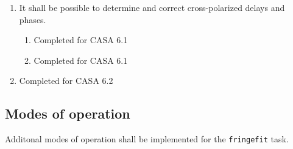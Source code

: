 \documentclass[11pt,a4paper]{article}
\begin{document}
\begin{enumerate}[subseclist]

\item It shall be possible to determine and correct cross-polarized
  delays and phases.

\begin{enumerate}[subsecsublist]

\item Completed for CASA 6.1

\item Completed for CASA 6.1

\end{enumerate}

\item Completed for CASA 6.2

\end{enumerate}


\subsection{Modes of operation}

Additonal modes of operation shall be implemented for the
\texttt{fringefit} task.
\end{document}

